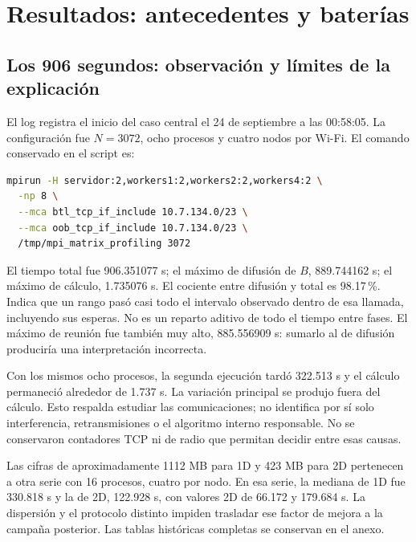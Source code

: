 \section{Resultados: antecedentes y baterías}

\subsection{Los 906 segundos: observación y límites de la explicación}

El log  registra el inicio del caso central el 24 de septiembre a las 00:58:05. La configuración fue $N=3072$, ocho procesos y cuatro nodos por Wi-Fi. El comando conservado en el script es:
\begin{lstlisting}[language=bash]
mpirun -H servidor:2,workers1:2,workers2:2,workers4:2 \
  -np 8 \
  --mca btl_tcp_if_include 10.7.134.0/23 \
  --mca oob_tcp_if_include 10.7.134.0/23 \
  /tmp/mpi_matrix_profiling 3072
\end{lstlisting}

El tiempo total fue 906.351077 s; el máximo de difusión de $B$, 889.744162 s; el máximo de cálculo, 1.735076 s. El cociente entre difusión y total es 98.17\,\%. Indica que un rango pasó casi todo el intervalo observado dentro de esa llamada, incluyendo sus esperas. No es un reparto aditivo de todo el tiempo entre fases. El máximo de reunión fue también muy alto, 885.556909 s: sumarlo al de difusión produciría una interpretación incorrecta.

\begin{table}[H]\caption{Serie original por Wi-Fi con dos repeticiones. $P=4,8,16$ usa respectivamente 1, 2 y 4 procesos en cada uno de los cuatro nodos. Todos los casos son de $N=3072$.}

\end{table}

Con los mismos ocho procesos, la segunda ejecución tardó 322.513 s y el cálculo permaneció alrededor de 1.737 s. La variación principal se produjo fuera del cálculo. Esto respalda estudiar las comunicaciones; no identifica por sí solo interferencia, retransmisiones o el algoritmo interno responsable. No se conservaron contadores TCP ni de radio que permitan decidir entre esas causas.

Las cifras de aproximadamente 1112 MB para 1D y 423 MB para 2D pertenecen a otra serie con 16 procesos, cuatro por nodo. En esa serie, la mediana de 1D fue 330.818 s y la de 2D, 122.928 s, con valores 2D de 66.172 y 179.684 s. La dispersión y el protocolo distinto impiden trasladar ese factor de mejora a la campaña posterior. Las tablas históricas completas se conservan en el anexo.

